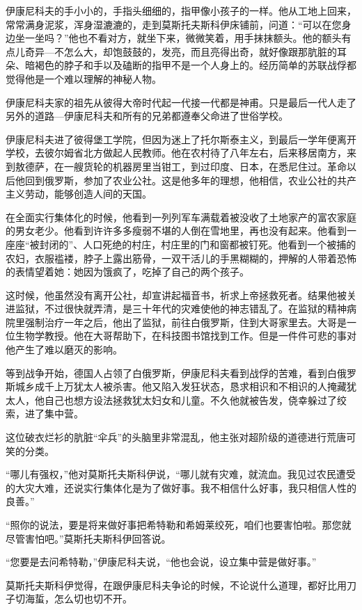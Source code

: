伊康尼科夫的手小小的，手指头细细的，指甲像小孩子的一样。他从工地上回来，常常满身泥浆，浑身湿漉漉的，走到莫斯托夫斯科伊床铺前，问道：“可以在您身边坐一坐吗？”他也不看对方，就坐下来，微微笑着，用手抹抹额头。他的额头有点儿奇异—不怎么大，却饱鼓鼓的，发亮，而且亮得出奇，就好像跟那肮脏的耳朵、暗褐色的脖子和手以及磕断的指甲不是一个人身上的。经历简单的苏联战俘都觉得他是一个难以理解的神秘人物。

伊康尼科夫家的祖先从彼得大帝时代起一代接一代都是神甫。只是最后一代人走了另外的道路—伊康尼科夫和所有的兄弟都遵奉父命进了世俗学校。

伊康尼科夫进了彼得堡工学院，但因为迷上了托尔斯泰主义，到最后一学年便离开学校，去彼尔姆省北方做起人民教师。他在农村待了八年左右，后来移居南方，来到敖德萨，在一艘货轮的机器房里当钳工，到过印度、日本，在悉尼住过。革命以后他回到俄罗斯，参加了农业公社。这是他多年的理想，他相信，农业公社的共产主义劳动，能够创造人间的天国。

在全面实行集体化的时候，他看到一列列军车满载着被没收了土地家产的富农家庭的男女老少。他看到许许多多瘦弱不堪的人倒在雪地里，再也没有起来。他看到一座座“被封闭的”、人口死绝的村庄，村庄里的门和窗都被钉死。他看到一个被捕的农妇，衣服褴褛，脖子上露出筋骨，一双干活儿的手黑糊糊的，押解的人带着恐怖的表情望着她：她因为饿疯了，吃掉了自己的两个孩子。

这时候，他虽然没有离开公社，却宣讲起福音书，祈求上帝拯救死者。结果他被关进监狱，不过很快就弄清，是三十年代的灾难使他的神志错乱了。在监狱的精神病院里强制治疗一年之后，他出了监狱，前往白俄罗斯，住到大哥家里去。大哥是一位生物学教授。他在大哥帮助下，在科技图书馆找到工作。但是一件件可悲的事对他产生了难以磨灭的影响。

等到战争开始，德国人占领了白俄罗斯，伊康尼科夫看到战俘的苦难，看到白俄罗斯城乡成千上万犹太人被杀害。他又陷入发狂状态，恳求相识和不相识的人掩藏犹太人，他自己也想方设法拯救犹太妇女和儿童。不久他就被告发，侥幸躲过了绞索，进了集中营。

这位破衣烂衫的肮脏“伞兵”的头脑里非常混乱，他主张对超阶级的道德进行荒唐可笑的分类。

“哪儿有强权，”他对莫斯托夫斯科伊说，“哪儿就有灾难，就流血。我见过农民遭受的大灾大难，还说实行集体化是为了做好事。我不相信什么好事，我只相信人性的良善。”

“照你的说法，要是将来做好事把希特勒和希姆莱绞死，咱们也要害怕啦。那您就尽管害怕吧。”莫斯托夫斯科伊回答说。

“您要是去问希特勒，”伊康尼科夫说，“他也会说，设立集中营是做好事。”

莫斯托夫斯科伊觉得，在跟伊康尼科夫争论的时候，不论说什么道理，都好比用刀子切海蜇，怎么切也切不开。

